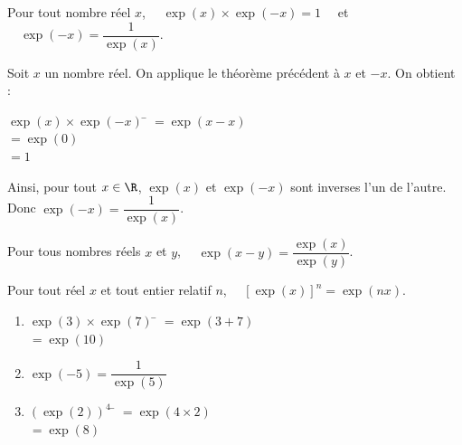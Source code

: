 \documentclass[a4paper,11pt,cours]{nsi} %
\begin{document}
\begin{propriete}[ ]
	Pour tout nombre réel $x$, $\quad \exp(x)\times \exp(-x)=1 \quad$ et $\quad \exp(-x)=\dfrac{1}{\exp(x)}$.
\end{propriete}
\begin{demonstration}
	Soit $x$ un nombre réel. 
	On applique le théorème précédent à $x$ et $-x$. On obtient :
	\begin{tabbing}
		$\exp(x)\times \exp(-x)$ \= $=\exp(x-x)$\\
		\>	$=\exp(0)$\\
		\>	$=1$
	\end{tabbing}
	Ainsi, pour tout $x\in \R$, $\exp(x)$ et $\exp(-x)$ sont inverses l'un de l'autre. Donc $\exp(-x)=\dfrac{1}{\exp(x)}$.
\end{demonstration}

\begin{propriete}[]
	Pour tous nombres réels $x$ et $y$, $\quad\exp(x-y)=\dfrac{\exp(x)}{\exp(y)}$.
\end{propriete}



\begin{propriete}[ (admise)]
	Pour tout réel $x$ et tout entier relatif $n$, $\quad \boxed{\left[\exp(x)\right]^n=\exp(nx)}$.
\end{propriete}

\setlength{\columnseprule}{0pt}

\begin{exemple}[s]
\begin{multicols}{3}
	\begin{enumerate}[label=\textbullet]
		\item 	\begin{tabbing}
			$\exp(3)\times\exp(7)$	\= $=\exp(3+7)$\\
			\>	$=\exp(10)$
		\end{tabbing}
		\item 	$\exp(-5)=\dfrac{1}{\exp(5)}$
		\item	\begin{tabbing}
			$\left(\exp(2)\right)^4$	\= $=\exp(4\times 2)$\\
			\>	$=\exp(8)$
		\end{tabbing}
	\end{enumerate}	
\end{multicols}
\end{exemple}
\end{document}
